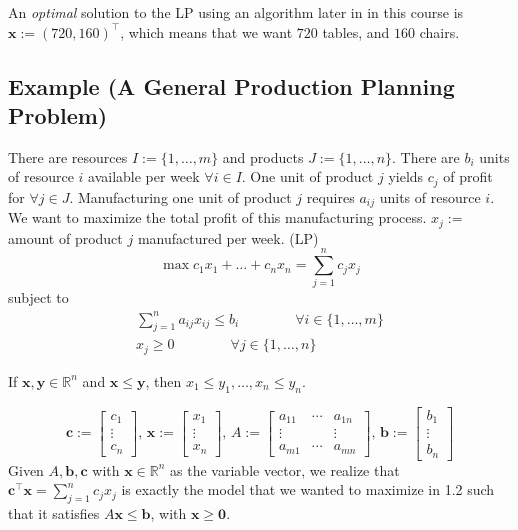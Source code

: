 An \emph{optimal} solution to the LP using an algorithm later in
in this course is $ \bm{x}:=(720,160)^\top $, which means
that we want $ 720 $ tables, and $ 160 $ chairs.

\subsection{Example (A General Production Planning Problem)}
There are resources $I:=\{1,\dots,m\}$ and products $J:=\{1,\dots,n\}$. 
There are $b_i$ units of resource
$i$ available per week $\forall i\in I$. One unit of product $j$ yields $c_j$ of profit for
$\forall j\in J$. Manufacturing one unit of product $j$ requires $a_{ij}$ units of resource $i$.
We want to maximize the total profit of this manufacturing process.
$x_j :=$ amount of product $j$ manufactured per week. (LP)
\[\max c_1x_1 + \dots + c_nx_n = \sum\limits_{j=1}^n c_jx_j\]
subject to
\begin{align*}
    \sum\limits_{j=1}^n a_{ij}x_{ij}\le b_i \qquad\qquad\forall i\in\{1,\dots,m\}\\
    x_{j}\ge 0 \qquad\qquad\forall j\in\{1,\dots,n\}
\end{align*}

\begin{remark}
    If $\bm{x},\bm{y}\in\mathbb{R}^n$ and $\bm{x}\le \bm{y}$, then
    $x_1\le y_1, \ldots, x_n\le y_n$.
\end{remark}

\begin{remark}
\[
\bm{c}:=\left[\begin{array}{c}{c_{1}} \\ {\vdots} \\ {c_{n}}\end{array}\right],\,
\bm{x}:=\left[\begin{array}{c}{x_{1}} \\ {\vdots} \\ {x_{n}}\end{array}\right],\,
A:=\left[\begin{array}{cccc}
    {a_{11}} & \cdots & {a_{1 n}} \\
    \vdots & & \vdots \\
     {a_{m 1}} & \cdots & {a_{m n}}
    \end{array}\right]
    ,\,
\bm{b}:=\left[\begin{array}{c}{b_{1}} \\ {\vdots} \\ {b_{n}}\end{array}\right]
\]
Given $A,\bm{b},\bm{c}$ with $\bm{x}\in\mathbb{R}^n$ as the variable vector, we realize that
$\bm{c}^\top  \bm{x}=\sum\limits_{j=1}^n c_jx_j$ is exactly the model that we wanted to maximize
in 1.2 such that it satisfies $A\bm{x}\le \bm{b}$, with $\bm{x}\ge \bm{0}$.
\end{remark}

